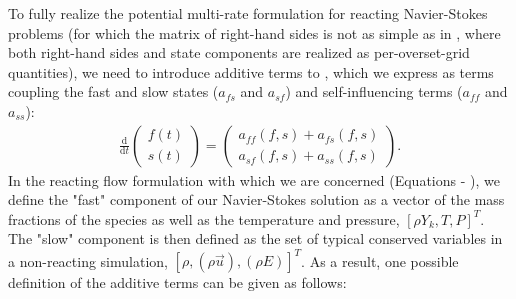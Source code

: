 To fully realize the potential multi-rate formulation for reacting
Navier-Stokes problems (for which the matrix of right-hand sides is
not as simple as in \cite{mikida2019multi}, where both right-hand sides
and state components are realized as per-overset-grid quantities),
we need to introduce additive terms to , which we express
as terms coupling the fast and slow states ($a_{fs}$ and $a_{sf}$) and
self-influencing terms ($a_{ff}$ and $a_{ss}$):
\begin{align}
\frac{\textrm{d}}{\textrm{d}t}\left( \begin{array}{c} f(t) \\ s(t) \end{array} \right) = \left( \begin{array}{c} a_{ff}(f,s) + a_{fs}(f,s) \\ a_{sf}(f,s) + a_{ss}(f,s) \end{array} \right). \label{eq:mr_reacting}
\end{align}
In the reacting flow formulation with which we are concerned (Equations  - ), we define
the "fast" component of our Navier-Stokes solution as a vector of the
mass fractions of the species as well as the temperature and pressure, $[\rho Y_{k}, T, P]^T$.
The "slow" component is then defined as the set of typical conserved variables in a
non-reacting simulation, $[\rho, (\rho \vec{u}), (\rho E)]^T$. As
a result, one possible definition of the additive terms  can be given as follows:
